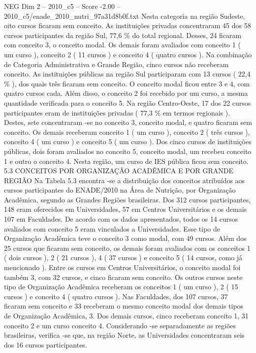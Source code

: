 \begin{textsample}{NEG Dim 2 – 2010\_c5 – Score -2.00 – 2010\_c5/enade\_2010\_nutri\_97a31d8b0f.txt}
Nesta categoria na região Sudeste, oito cursos ficaram sem conceito.
As instituições privadas concentraram 45 dos 58 cursos participantes da região Sul, 77,6 \% do total regional.
Desses, 24 ficaram com conceito 3, o conceito modal.
Os demais foram avaliados com conceito 1 ( um curso ), conceito 2 ( 11 cursos ) e conceito 4 ( quatro cursos ).
Na combinação de Categoria Administrativa e Grande Região, cinco cursos não receberam conceito.
As instituições públicas na região Sul participaram com 13 cursos ( 22,4 \% ), dos quais três ficaram sem conceito.
O conceito modal ficou entre 3 e 4, com quatro cursos cada.
Além disso, o conceito 2 foi recebido por um curso, a mesma quantidade verificada para o conceito 5.
Na região Centro-Oeste, 17 dos 22 cursos participantes eram de instituições privadas ( 77,3 \% em termos regionais ).
Destes, sete concentraram -se no conceito 3, conceito modal, e quatro ficaram sem conceito.
Os demais receberam conceito 1 ( um curso ), conceito 2 ( três cursos ), conceito 4 ( um curso ) e conceito 5 ( um curso ).
Dos cinco cursos de instituições públicas, dois foram avaliados no conceito 5, conceito modal, um recebeu conceito 1 e outro o conceito 4.
Nesta região, um curso de IES pública ficou sem conceito. 5.3 CONCEITOS POR ORGANIZAÇÃO ACADÊMICA E POR GRANDE REGIÃO Na Tabela 5.3 encontra -se a distribuição dos conceitos atribuídos aos cursos participantes do ENADE/2010 na Área de Nutrição, por Organização Acadêmica, segundo as Grandes Regiões brasileiras.
Dos 312 cursos participantes, 148 eram oferecidos em Universidades, 57 em Centros Universitários e os demais 107 em Faculdades.
De acordo com os dados apresentados, todos os 14 cursos avaliados com conceito 5 eram vinculados a Universidades.
Esse tipo de Organização Acadêmica teve o conceito 3 como modal, com 49 cursos.
Além dos 25 cursos que ficaram sem conceito, os demais foram avaliados com os conceitos 1 ( dois cursos ), 2 ( 21 cursos ), 4 ( 37 cursos ) e conceito 5 ( 14 cursos, como já mencionado ).
Entre os cursos em Centros Universitários, o conceito modal foi também 3, com 32 cursos, e cinco ficaram sem conceito.
Os outros cursos neste tipo de Organização Acadêmica receberam os conceitos 1 ( um curso ), 2 ( 15 cursos ) e conceito 4 ( quatro cursos ).
Nas Faculdades, dos 107 cursos, 37 ficaram sem conceito e 33 receberam o mesmo conceito modal dos demais tipos de Organização Acadêmica, 3.
Dos demais cursos, cinco receberam conceito 1, 31 conceito 2 e um curso conceito 4.
Considerando -se separadamente as regiões brasileiras, verifica -se que, na região Norte, as Universidades concentraram seis dos 16 cursos participantes.

\end{textsample}
